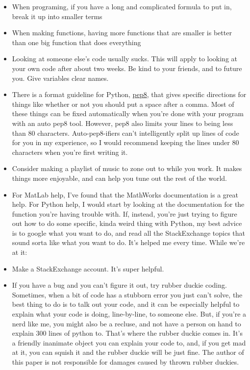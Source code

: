 \documentclass[letterpaper]{article}
\begin{document}
\begin{itemize}

\item When programing, if you have a long and complicated formula to put in, break it up into smaller terms
\item When making functions, having more functions that are smaller is better than one big function that does everything
\item Looking at someone else's code usually sucks.  This will apply to looking at your own code after about two weeks.  Be kind to your friends, and to future you.  Give variables clear names.
\item There is a format guideline for Python, \href{https://www.python.org/dev/peps/pep-0008/}{pep8}, that gives specific directions for things like whether or not you should put a space after a comma.   Most of these things can be fixed automatically when you're done with your program with an auto pep8 tool.  However, pep8 also limits your lines to being less than 80 characters.  Auto-pep8-ifiers can't intelligently split up lines of code for you in my experience, so I would recommend keeping the lines under 80 characters when you're first writing it.
\item Consider making a playlist of music to zone out to while you work.  It makes things more enjoyable, and can help you tune out the rest of the world.
\item For MatLab help, I've found that the MathWorks documentation is a great help.  For Python help, I would start by looking at the documentation for the function you're having trouble with.  If, instead, you're just trying to figure out how to do some specific, kinda weird thing with Python, my best advice is to google what you want to do, and read all the StackExchange topics that sound sorta like what you want to do.  It's helped me every time.  While we're at it:
\item Make a StackExchange account.  It's super helpful.
\item If you have a bug and you can't figure it out, try rubber duckie coding.  Sometimes, when a bit of code has a stubborn error you just can't solve, the best thing to do is to talk out your code, and it can be especially helpful to explain what your code is doing, line-by-line, to someone else.  But, if you're a nerd like me, you might also be a recluse, and not have a person on hand to explain 300 lines of python to.  That's where the rubber duckie comes in.  It's a friendly inanimate object you can explain your code to, and, if you get mad at it, you can squish it and the rubber duckie will be just fine.  The author of this paper is not responsible for damages caused by thrown rubber duckies.
\end{itemize}
\end{document}
